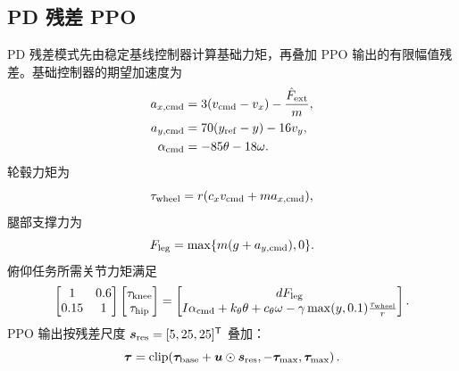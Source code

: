 \documentclass[UTF8,12pt,a4paper,fontset=none]{ctexart}
\begin{document}
\subsection{PD 残差 PPO}
PD 残差模式先由稳定基线控制器计算基础力矩，再叠加 PPO 输出的有限幅值残差。基础控制器的期望加速度为
\begin{align}
a_{x,\rm cmd}&=3(v_{\rm cmd}-v_x)-\frac{\hat F_{\rm ext}}{m},\\
a_{y,\rm cmd}&=70(y_{\rm ref}-y)-16v_y,\\
\alpha_{\rm cmd}&=-85\theta-18\omega.
\end{align}
轮毂力矩为
\begin{equation}
\tau_{\rm wheel}=r(c_xv_{\rm cmd}+ma_{x,\rm cmd}),
\end{equation}
腿部支撑力为
\begin{equation}
F_{\rm leg}=\max\{m(g+a_{y,\rm cmd}),0\}.
\end{equation}
俯仰任务所需关节力矩满足
\begin{equation}
\begin{bmatrix}
1 & 0.6\\
0.15 & 1
\end{bmatrix}
\begin{bmatrix}
\tau_{\rm knee}\\
\tau_{\rm hip}
\end{bmatrix}
=
\begin{bmatrix}
dF_{\rm leg}\\
I\alpha_{\rm cmd}+k_\theta\theta+c_\theta\omega-\gamma\max(y,0.1)\frac{\tau_{\rm wheel}}{r}
\end{bmatrix}.
\end{equation}
PPO 输出按残差尺度 $\bm s_{\rm res}=[5,25,25]^{\mathsf T}$ 叠加：
\begin{equation}
\bm\tau=\operatorname{clip}\!\left(\bm\tau_{\rm base}+\bm u\odot\bm s_{\rm res},
-\bm\tau_{\max},\bm\tau_{\max}\right).
\end{equation}
\end{document}
